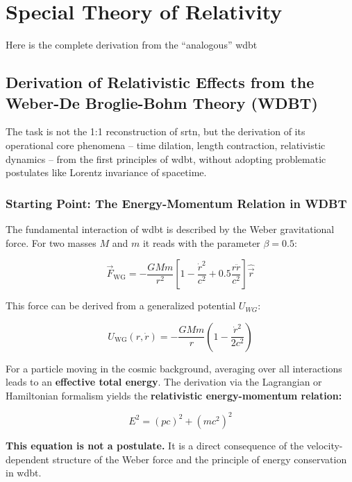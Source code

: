 \chapter{Special Theory of Relativity}
Here is the complete derivation from the \enquote{analogous} \gls{wdbt}

\section{Derivation of Relativistic Effects from the Weber-De Broglie-Bohm Theory (WDBT)}
The task is not the 1:1 reconstruction of \gls{srtn}, but the derivation of its operational core phenomena – time dilation, length contraction, relativistic dynamics – from the first principles of \gls{wdbt}, without adopting problematic postulates like Lorentz invariance of spacetime.

\subsection{Starting Point: The Energy-Momentum Relation in WDBT}
The fundamental interaction of \gls{wdbt} is described by the Weber gravitational force. For two masses $M$ and $m$ it reads with the parameter $\beta = 0.5$:

\begin{equation}
    \label{eq:weber_g}
    \vec{F}_{\text{WG}} = -\frac{G M m}{r^2} \left[ 1 - \frac{\dot{r}^2}{c^2} + 0.5 \frac{r \ddot{r}}{c^2} \right] \hat{\vec{r}}
\end{equation}

This force can be derived from a generalized potential $U_{WG}$:

\begin{equation}
    \label{eq:potential}
    U_{\text{WG}}(r, \dot{r}) = -\frac{G M m}{r} \left( 1 - \frac{\dot{r}^2}{2c^2} \right)
\end{equation}

For a particle moving in the cosmic background, averaging over all interactions leads to an \textbf{effective total energy}. The derivation via the Lagrangian or Hamiltonian formalism yields the \textbf{relativistic energy-momentum relation:}

\begin{equation}
    \label{eq:energie_impuls_beziehung}
    \boxed
    {
        E^2 = (p c)^2 + (m c^2)^2
    }
\end{equation}

\textbf{This equation is not a postulate.} It is a direct consequence of the velocity-dependent structure of the Weber force and the principle of energy conservation in \gls{wdbt}.

